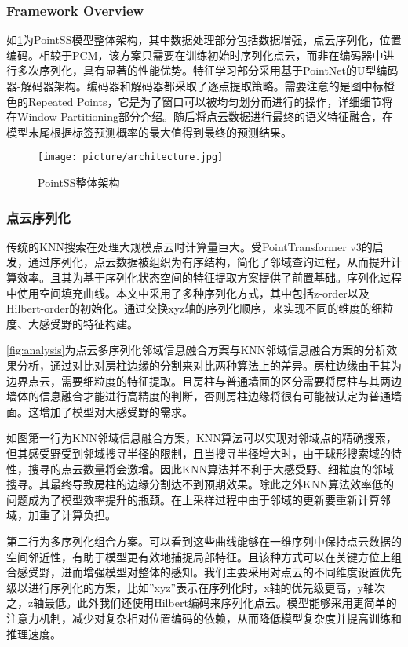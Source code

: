 \documentclass[preprint,12pt]{elsarticle}
\begin{document}
\subsubsection{ Framework Overview}
如\cref{fig:architecture}为PointSS模型整体架构，其中数据处理部分包括数据增强，点云序列化，位置编码。相较于PCM，该方案只需要在训练初始时序列化点云，而非在编码器中进行多次序列化，具有显著的性能优势。特征学习部分采用基于PointNet的U型编码器-解码器架构。编码器和解码器都采取了逐点提取策略。需要注意的是图中标橙色的Repeated Points，它是为了窗口可以被均匀划分而进行的操作，详细细节将在Window Partitioning部分介绍。随后将点云数据进行最终的语义特征融合，在模型末尾根据标签预测概率的最大值得到最终的预测结果。
\begin{figure}[htbp]
	\centering
	\texttt{[image: picture/architecture.jpg]}
	\caption{PointSS整体架构}
	\label{fig:architecture}
\end{figure}



\subsubsection{点云序列化}
传统的KNN搜索在处理大规模点云时计算量巨大。受PointTransformer v3\cite{ptv3}的启发，通过序列化，点云数据被组织为有序结构，简化了邻域查询过程，从而提升计算效率。且其为基于序列化状态空间的特征提取方案提供了前置基础。序列化过程中使用空间填充曲线。本文中采用了多种序列化方式，其中包括z-order以及Hilbert-order的初始化。通过交换xyz轴的序列化顺序，来实现不同的维度的细粒度、大感受野的特征构建。

\cref{fig:analysis}为点云多序列化邻域信息融合方案与KNN邻域信息融合方案的分析效果分析，通过对比对房柱边缘的分割来对比两种算法上的差异。房柱边缘由于其为边界点云，需要细粒度的特征提取。且房柱与普通墙面的区分需要将房柱与其两边墙体的信息融合才能进行高精度的判断，否则房柱边缘将很有可能被认定为普通墙面。这增加了模型对大感受野的需求。

如图第一行为KNN邻域信息融合方案，KNN算法可以实现对邻域点的精确搜索，但其感受野受到邻域搜寻半径的限制，且当搜寻半径增大时，由于球形搜索域的特性，搜寻的点云数量将会激增。因此KNN算法并不利于大感受野、细粒度的邻域搜寻。其最终导致房柱的边缘分割达不到预期效果。除此之外KNN算法效率低的问题成为了模型效率提升的瓶颈。在上采样过程中由于邻域的更新要重新计算邻域，加重了计算负担。

第二行为多序列化组合方案。可以看到这些曲线能够在一维序列中保持点云数据的空间邻近性，有助于模型更有效地捕捉局部特征。且该种方式可以在关键方位上组合感受野，进而增强模型对整体的感知。我们主要采用对点云的不同维度设置优先级以进行序列化的方案，比如”xyz”表示在序列化时，x轴的优先级更高，y轴次之，z轴最低。此外我们还使用Hilbert编码来序列化点云。模型能够采用更简单的注意力机制，减少对复杂相对位置编码的依赖，从而降低模型复杂度并提高训练和推理速度。
\end{document}
